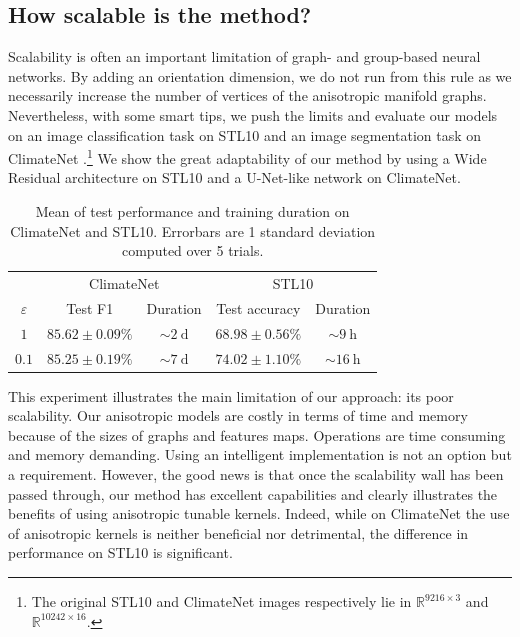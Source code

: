 \documentclass{article}
\begin{document}
\subsection{How scalable is the method?}

Scalability is often an important limitation of graph- and group-based neural networks. By adding an orientation dimension, we do not run from this rule as we necessarily increase the number of vertices of the anisotropic manifold graphs. Nevertheless, with some smart tips, we push the limits and evaluate our models on an image classification task on STL10 \citep{coates2011analysis} and an image segmentation task on ClimateNet \citep{kashinath2021climatenet}.\footnote{The original STL10 and ClimateNet images respectively lie in $\mathbb{R}^{9216 \times 3}$ and $\mathbb{R}^{10242 \times 16}$.} We show the great adaptability of our method by using a Wide Residual architecture \citep{zagoruyko2016wide} on STL10 and a U-Net-like network \citep{ronneberger2015u} on ClimateNet.

\begin{table}[h!]
\centering 
\caption{Mean of test performance and training duration on ClimateNet and STL10. Errorbars are 1 standard deviation computed over 5 trials.}
\begin{tabular}{c c c c c}
\toprule
 & \multicolumn{2}{c}{ClimateNet} & \multicolumn{2}{c}{STL10} \\
$\varepsilon$ & Test F1 & Duration & Test accuracy & Duration \\
\midrule
$1$ & $\boldsymbol{85.62 \pm 0.09 \%}$ & $\sim \SI{2}{\day}$ & $68.98 \pm 0.56 \%$ & $\sim \SI{9}{\hour}$ \\
$0.1$ & $85.25 \pm 0.19 \%$ & $\sim \SI{7}{\day}$ & $\boldsymbol{74.02 \pm 1.10 \%}$ & $\sim \SI{16}{\hour}$ \\
\bottomrule
\end{tabular}
\end{table}

This experiment illustrates the main limitation of our approach: its poor scalability. Our anisotropic models are costly in terms of time and memory because of the sizes of graphs and features maps. Operations are time consuming and memory demanding. Using an intelligent implementation is not an option but a requirement. However, the good news is that once the scalability wall has been passed through, our method has excellent capabilities and clearly illustrates the benefits of using anisotropic tunable kernels. Indeed, while on ClimateNet the use of anisotropic kernels is neither beneficial nor detrimental, the difference in performance on STL10 is significant.
\end{document}
